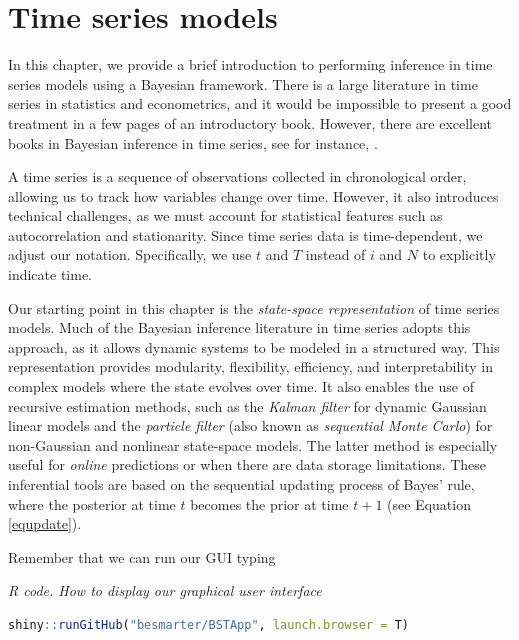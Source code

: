 \chapter{Time series models}\label{chap8}
In this chapter, we provide a brief introduction to performing inference in time series models using a Bayesian framework. There is a large literature in time series in statistics and econometrics, and it would be impossible to present a good treatment in a few pages of an introductory book. However, there are excellent books in Bayesian inference in time series, see for instance, \cite{west2006bayesian,petris2009dynamic,pole2018applied}.

A time series is a sequence of observations collected in chronological order, allowing us to track how variables change over time. However, it also introduces technical challenges, as we must account for statistical features such as autocorrelation and stationarity. Since time series data is time-dependent, we adjust our notation. Specifically, we use $t$ and $T$ instead of $i$ and $N$ to explicitly indicate time.

Our starting point in this chapter is the \textit{state-space representation} of time series models. Much of the Bayesian inference literature in time series adopts this approach, as it allows dynamic systems to be modeled in a structured way. This representation provides modularity, flexibility, efficiency, and interpretability in complex models where the state evolves over time. It also enables the use of recursive estimation methods, such as the \textit{Kalman filter} for dynamic Gaussian linear models and the \textit{particle filter} (also known as \textit{sequential Monte Carlo}) for non-Gaussian and nonlinear state-space models. The latter method is especially useful for \textit{online} predictions or when there are data storage limitations. These inferential tools are based on the sequential updating process of Bayes' rule, where the posterior at time $t$ becomes the prior at time $t+1$ (see Equation \ref{equpdate}).

Remember that we can run our GUI typing

\begin{tcolorbox}[enhanced,width=4.67in,center upper,
	fontupper=\large\bfseries,drop shadow southwest,sharp corners]
	\textit{R code. How to display our graphical user interface}
	\begin{VF}
		\begin{lstlisting}[language=R]
		shiny::runGitHub("besmarter/BSTApp", launch.browser = T)\end{lstlisting}
	\end{VF}
\end{tcolorbox} 

